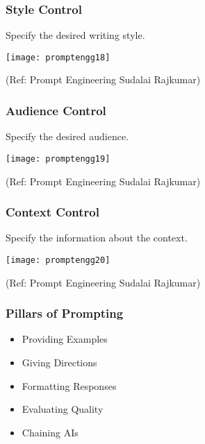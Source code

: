 \begin{frame}[fragile]\frametitle{Style Control}

Specify the desired writing style.

\begin{center}
\texttt{[image: promptengg18]}

{\tiny (Ref: Prompt Engineering Sudalai Rajkumar)}

\end{center}		
	
\end{frame}

\begin{frame}[fragile]\frametitle{Audience Control}

Specify the desired audience.

\begin{center}
\texttt{[image: promptengg19]}

{\tiny (Ref: Prompt Engineering Sudalai Rajkumar)}

\end{center}		

\end{frame}

\begin{frame}[fragile]\frametitle{Context Control}

Specify the information about the context.

\begin{center}
\texttt{[image: promptengg20]}

{\tiny (Ref: Prompt Engineering Sudalai Rajkumar)}

\end{center}		

\end{frame}



\begin{frame}[fragile]\frametitle{Pillars of Prompting}

\begin{itemize}
\item Providing Examples
\item Giving Directions
\item Formatting Responses
\item Evaluating Quality
\item Chaining AIs
\end{itemize}	 

\end{frame}

